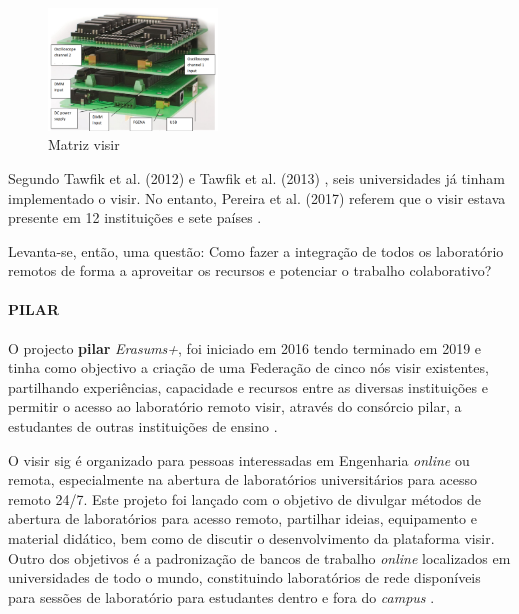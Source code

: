\begin{figure}[hbtp]
    \centering
    \includegraphics[width=0.4\textwidth]{figures/matriz.png}
    \caption{Matriz \acrshort{visir}\cite{matriz}}
    \label{fig:matrizvisir}
\end{figure}

Segundo Tawfik et al. (2012) \cite{tawfikexperiences} e Tawfik et al. (2013) \cite{tawfikvisir}, seis universidades já tinham implementado o \acrshort{visir}. No entanto, Pereira et al. (2017) referem que o \acrshort{visir} estava presente em 12 instituições e sete países \cite{pereira}.

Levanta-se, então, uma questão: Como fazer a integração de todos os \acrshort{laboratório remoto}s de forma a aproveitar os recursos e potenciar o trabalho colaborativo?

\paragraph{PILAR}
O projecto \textbf{\acrfull{pilar}} \textit{Erasums+}, foi iniciado em 2016 tendo terminado em 2019 e tinha como objectivo a criação de uma Federação de cinco nós \acrshort{visir} existentes, partilhando experiências, capacidade e recursos entre as diversas instituições e permitir o acesso ao \acrshort{laboratório remoto} \acrshort{visir}, através do consórcio \acrshort{pilar}, a estudantes de outras instituições de ensino \cite{garcia-loro}.

O \acrshort{visir} \acrfull{sig} é organizado para pessoas interessadas em Engenharia \textit{online} ou remota, especialmente na abertura de laboratórios universitários para acesso remoto 24/7. Este projeto foi lançado com o objetivo de divulgar métodos de abertura de laboratórios para acesso remoto,  partilhar ideias, equipamento e material didático, bem como de discutir o desenvolvimento da plataforma \acrshort{visir}. Outro dos objetivos é a padronização de bancos de trabalho \textit{online} localizados em universidades de todo o mundo, constituindo laboratórios de rede disponíveis para sessões de laboratório para estudantes dentro e fora do \textit{campus} \cite{visirsig}.

